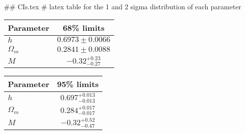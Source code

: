 ## CIs.tex
# latex table for the 1 and 2 sigma distribution of each parameter

\begin{tabular} { l  c}
 Parameter &  68\% limits\\
\hline
{\boldmath$h              $} & $0.6973\pm 0.0066          $\\
{\boldmath$\Omega_m       $} & $0.2841\pm 0.0088          $\\
{\boldmath$M              $} & $-0.32^{+0.23}_{-0.27}     $\\
\hline
\end{tabular}

\begin{tabular} { l  c}
 Parameter &  95\% limits\\
\hline
{\boldmath$h              $} & $0.697^{+0.013}_{-0.013}   $\\
{\boldmath$\Omega_m       $} & $0.284^{+0.017}_{-0.017}   $\\
{\boldmath$M              $} & $-0.32^{+0.52}_{-0.47}     $\\
\hline
\end{tabular}

